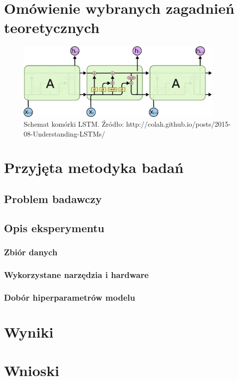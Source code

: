 \documentclass[oneside, mag]{mgr}
\begin{document}
\chapter{Omówienie wybranych zagadnień teoretycznych}

\begin{figure}
\centering
	\includegraphics[width=0.90\textwidth]{img/lstm_colah.png}
	\caption{Schemat komórki LSTM. Źródło: http://colah.github.io/posts/2015-08-Understanding-LSTMs/}
	\label{fig:lstm}
\end{figure}

\chapter{Przyjęta metodyka badań}


\section{Problem badawczy}


\section{Opis eksperymentu}

\subsection{Zbiór danych}

\subsection{Wykorzystane narzędzia i hardware}

\subsection{Dobór hiperparametrów modelu}


\chapter{Wyniki}


\chapter{Wnioski}



\tableofcontents

\listoffigures
\end{document}
